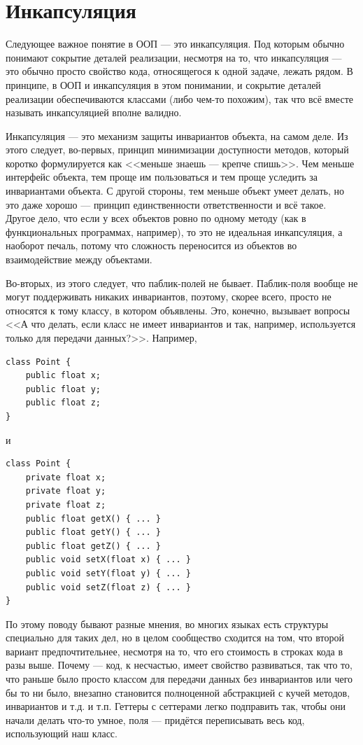 \documentclass[a5paper]{article}
\begin{document}
\section{Инкапсуляция}

Следующее важное понятие в ООП --- это инкапсуляция. Под которым обычно понимают сокрытие деталей реализации, несмотря на то, что инкапсуляция --- это обычно просто свойство кода, относящегося к одной задаче, лежать рядом. В принципе, в ООП и инкапсуляция в этом понимании, и сокрытие деталей реализации обеспечиваются классами (либо чем-то похожим), так что всё вместе называть инкапсуляцией вполне валидно.

Инкапсуляция --- это механизм защиты инвариантов объекта, на самом деле. Из этого следует, во-первых, принцип минимизации доступности методов, который коротко формулируется как <<меньше знаешь --- крепче спишь>>. Чем меньше интерфейс объекта, тем проще им пользоваться и тем проще уследить за инвариантами объекта. С другой стороны, тем меньше объект умеет делать, но это даже хорошо --- принцип единственности ответственности и всё такое. Другое дело, что если у всех объектов ровно по одному методу (как в функциональных программах, например), то это не идеальная инкапсуляция, а наоборот печаль, потому что сложность переносится из объектов во взаимодействие между объектами.

Во-вторых, из этого следует, что паблик-полей не бывает. Паблик-поля вообще не могут поддерживать никаких инвариантов, поэтому, скорее всего, просто не относятся к тому классу, в котором объявлены. Это, конечно, вызывает вопросы <<А что делать, если класс не имеет инвариантов и так, например, используется только для передачи данных?>>. Например,

\begin{verbatim}
class Point {
    public float x;
    public float y;
    public float z;
}
\end{verbatim}

и

\begin{verbatim}
class Point {
    private float x;
    private float y;
    private float z;
    public float getX() { ... }
    public float getY() { ... }
    public float getZ() { ... }
    public void setX(float x) { ... }
    public void setY(float y) { ... }
    public void setZ(float z) { ... }
}
\end{verbatim}

По этому поводу бывают разные мнения, во многих языках есть структуры специально для таких дел, но в целом сообщество сходится на том, что второй вариант предпочтительнее, несмотря на то, что его стоимость в строках кода в разы выше. Почему --- код, к несчастью, имеет свойство развиваться, так что то, что раньше было просто классом для передачи данных без инвариантов или чего бы то ни было, внезапно становится полноценной абстракцией с кучей методов, инвариантов и т.д. и т.п. Геттеры с сеттерами легко подправить так, чтобы они начали делать что-то умное, поля --- придётся переписывать весь код, использующий наш класс.
\end{document}
